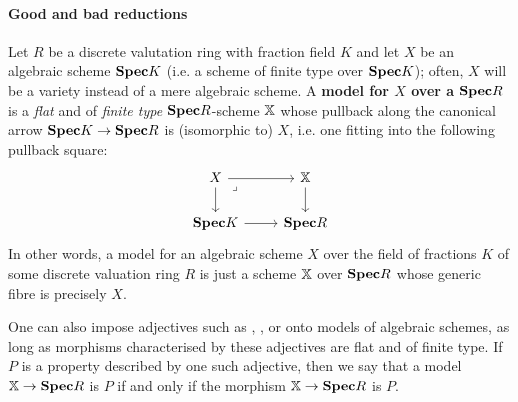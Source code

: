                \paragraph{Good and bad reductions}
                    \begin{definition}[Models] \label{def: local_models_of_varieties} 
                        Let $R$ be a discrete valutation ring with fraction field $K$ and let $X$ be an algebraic scheme $\mathbf{Spec} K$ (i.e. a scheme of finite type over $\mathbf{Spec} K$); often, $X$ will be a variety instead of a mere algebraic scheme. A \textbf{model for $X$ over a $\mathbf{Spec} R$} is a \textit{flat} and of \textit{finite type} $\mathbf{Spec} R$-scheme $\mathbb{X}$ whose pullback along the canonical arrow $\mathbf{Spec} K \to \mathbf{Spec} R$ is (isomorphic to) $X$, i.e. one fitting into the following pullback square:
                            $$
                                \begin{tikzcd}
                                	X & \bbX \\
                                	{\Spec K} & {\Spec R}
                                	\arrow[from=1-1, to=2-1]
                                	\arrow[from=2-1, to=2-2]
                                	\arrow[from=1-2, to=2-2]
                                	\arrow[from=1-1, to=1-2]
                                	\arrow["\lrcorner"{anchor=center, pos=0.125}, draw=none, from=1-1, to=2-2]
                                \end{tikzcd}
                            $$
                        In other words, a model for an algebraic scheme $X$ over the field of fractions $K$ of some discrete valuation ring $R$ is just a scheme $\mathbb{X}$ over $\mathbf{Spec} R$ whose generic fibre is precisely $X$. 
                        
                        One can also impose adjectives such as , , or  onto models of algebraic schemes, as long as morphisms characterised by these adjectives are flat and of finite type. If $P$ is a property described by one such adjective, then we say that a model $\mathbb{X} \to \mathbf{Spec} R$ is $P$ if and only if the morphism $\mathbb{X} \to \mathbf{Spec} R$ is $P$.
                    \end{definition}
                

